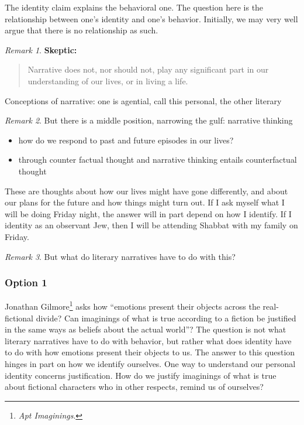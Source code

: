 \documentclass[phdthesis,12pt,final]{wuthesis}
\theoremstyle{definition}
\theoremstyle{definition}
\theoremstyle{definition}
\theoremstyle{definition}
\theoremstyle{remark}
\newtheorem*{remark}{Remark}
\begin{document}
The identity claim explains the behavioral one. The question here is the relationship between one's identity and one's behavior. Initially, we may very well argue that there is no relationship as such.

\begin{remark}

\textbf{Skeptic:}

\begin{quote}
Narrative does not, nor should not, play any significant part in our understanding of our lives, or in living a life.
\end{quote}

\end{remark}

Conceptions of narrative: one is agential, call this personal, the other literary

\begin{remark}

But there is a middle position, narrowing the gulf: narrative thinking

\begin{itemize}
\item
  how do we respond to past and future episodes in our lives?
\item
  through counter factual thought and narrative thinking entails counterfactual thought
\end{itemize}

\end{remark}

These are thoughts about how our lives might have gone differently, and about our plans for the future and how things might turn out. If I ask myself what I will be doing Friday night, the answer will in part depend on how I identify. If I identity as an observant Jew, then I will be attending Shabbat with my family on Friday.

\begin{remark}
But what do literary narratives have to do with this?
\end{remark}

\subsubsection*{Option 1}\label{option-1}

Jonathan Gilmore\footnote{\emph{Apt {Imaginings}}.} asks how ``emotions present their objects across the real-fictional divide? Can imaginings of what is true according to a fiction be justified in the same ways as beliefs about the actual world''? The question is not what literary narratives have to do with behavior, but rather what does identity have to do with how emotions present their objects to us. The answer to this question hinges in part on how we identify ourselves. One way to understand our personal identity concerns justification. How do we justify imaginings of what is true about fictional characters who in other respects, remind us of ourselves?
\end{document}
